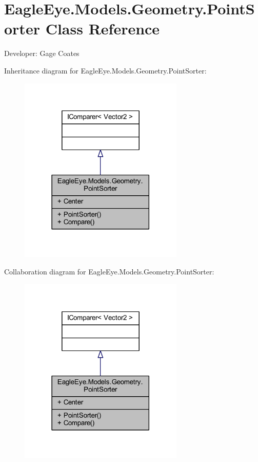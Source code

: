 \hypertarget{class_eagle_eye_1_1_models_1_1_geometry_1_1_point_sorter}{}\section{Eagle\+Eye.\+Models.\+Geometry.\+Point\+Sorter Class Reference}
\label{class_eagle_eye_1_1_models_1_1_geometry_1_1_point_sorter}


Developer\+: Gage Coates  




Inheritance diagram for Eagle\+Eye.\+Models.\+Geometry.\+Point\+Sorter\+:
\nopagebreak
\begin{figure}[H]
\begin{center}
\leavevmode
\includegraphics[width=222pt]{class_eagle_eye_1_1_models_1_1_geometry_1_1_point_sorter__inherit__graph}
\end{center}
\end{figure}


Collaboration diagram for Eagle\+Eye.\+Models.\+Geometry.\+Point\+Sorter\+:
\nopagebreak
\begin{figure}[H]
\begin{center}
\leavevmode
\includegraphics[width=222pt]{class_eagle_eye_1_1_models_1_1_geometry_1_1_point_sorter__coll__graph}
\end{center}
\end{figure}
